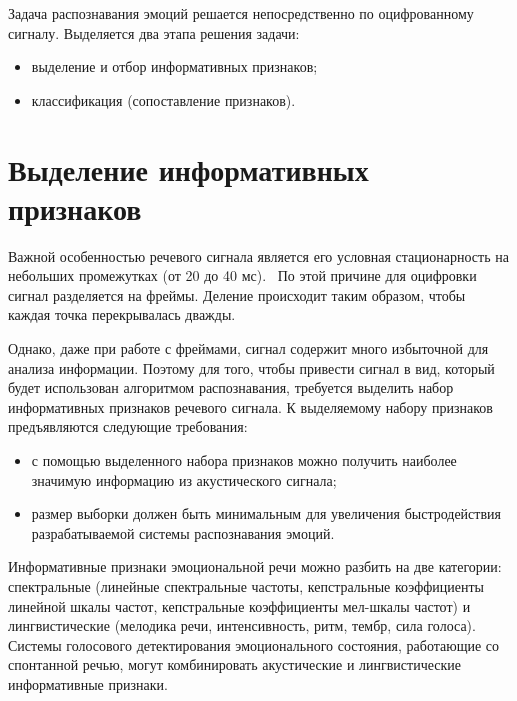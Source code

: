 Задача распознавания эмоций решается непосредственно по оцифрованному сигналу. Выделяется два этапа решения задачи:
\begin{itemize}
	\item выделение и отбор информативных признаков;
	\item классификация (сопоставление признаков).
\end{itemize}
\section{Выделение информативных признаков}
Важной особенностью речевого сигнала является его условная стационарность на небольших промежутках (от 20 до 40 мс).~\cite{frames} По этой причине для оцифровки сигнал разделяется на фреймы. Деление происходит таким образом, чтобы каждая точка перекрывалась дважды.~\cite{mfcc-steps}

Однако, даже при работе с фреймами, сигнал содержит много избыточной для анализа информации. Поэтому для того, чтобы привести сигнал в вид, который будет использован алгоритмом распознавания, требуется выделить набор информативных признаков речевого сигнала. К выделяемому набору признаков предъявляются следующие требования: \cite{features-must}
\begin{itemize}
	\item с помощью выделенного набора признаков можно получить наиболее значимую информацию из акустического сигнала;
	\item размер выборки должен быть минимальным для увеличения быстродействия разрабатываемой системы распознавания эмоций.
\end{itemize}
Информативные признаки эмоциональной речи можно разбить на две категории: спектральные (линейные спектральные частоты, кепстральные коэффициенты линейной шкалы частот, кепстральные коэффициенты мел-шкалы частот) и лингвистические (мелодика речи, интенсивность, ритм, тембр, сила голоса).~\cite{schuller2011recognising} Системы голосового детектирования эмоционального состояния, работающие со спонтанной речью, могут комбинировать акустические и лингвистические информативные признаки. 

